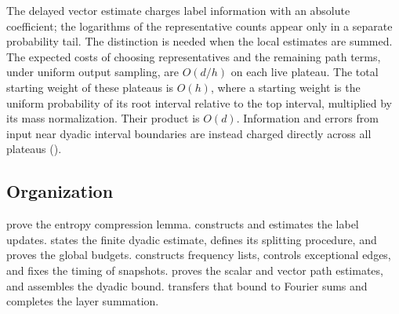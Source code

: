 \begin{enumerate}[leftmargin=*,itemsep=4pt]
The delayed vector estimate charges label
information with an absolute coefficient; the logarithms of the
representative counts appear only in a separate probability tail.
The distinction is needed when the local estimates are summed. The
expected costs of choosing representatives and the remaining path terms,
under uniform output sampling, are $O(d/h)$ on each live plateau. The total starting weight
of these plateaus is $O(h)$, where a starting weight is the uniform
probability of its root interval relative to the top interval, multiplied
by its mass normalization. Their product is $O(d)$. Information and
errors from input near dyadic interval boundaries are instead charged
directly across all plateaus
().
\end{enumerate}

\subsection{Organization}

 prove the entropy
compression lemma.  constructs and estimates the label
updates.  states the finite dyadic estimate, defines its
splitting procedure, and proves the global budgets.  constructs frequency lists,
controls exceptional edges, and fixes the timing of snapshots.
 proves the scalar and vector path estimates, and
 assembles the dyadic bound.
 transfers that bound to Fourier sums and completes
the layer summation.
